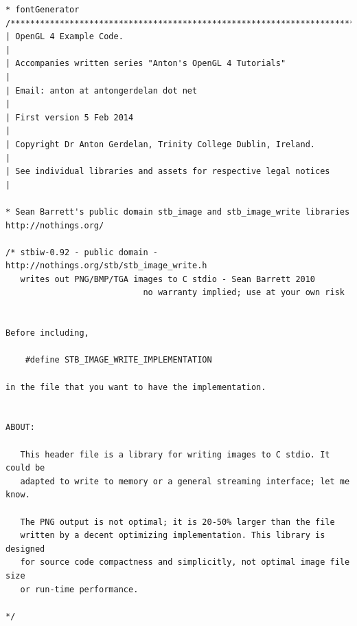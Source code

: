 \documentclass{article}
\begin{document}
\begin{lstlisting}
* fontGenerator
/******************************************************************************\
| OpenGL 4 Example Code.                                                       |
| Accompanies written series "Anton's OpenGL 4 Tutorials"                      |
| Email: anton at antongerdelan dot net                                        |
| First version 5 Feb 2014                                                     |
| Copyright Dr Anton Gerdelan, Trinity College Dublin, Ireland.                |
| See individual libraries and assets for respective legal notices             |

* Sean Barrett's public domain stb_image and stb_image_write libraries
http://nothings.org/

/* stbiw-0.92 - public domain - http://nothings.org/stb/stb_image_write.h
   writes out PNG/BMP/TGA images to C stdio - Sean Barrett 2010
                            no warranty implied; use at your own risk


Before including,

    #define STB_IMAGE_WRITE_IMPLEMENTATION

in the file that you want to have the implementation.


ABOUT:

   This header file is a library for writing images to C stdio. It could be
   adapted to write to memory or a general streaming interface; let me know.

   The PNG output is not optimal; it is 20-50% larger than the file
   written by a decent optimizing implementation. This library is designed
   for source code compactness and simplicitly, not optimal image file size
   or run-time performance.

*/
\end{lstlisting}



\end{document}
